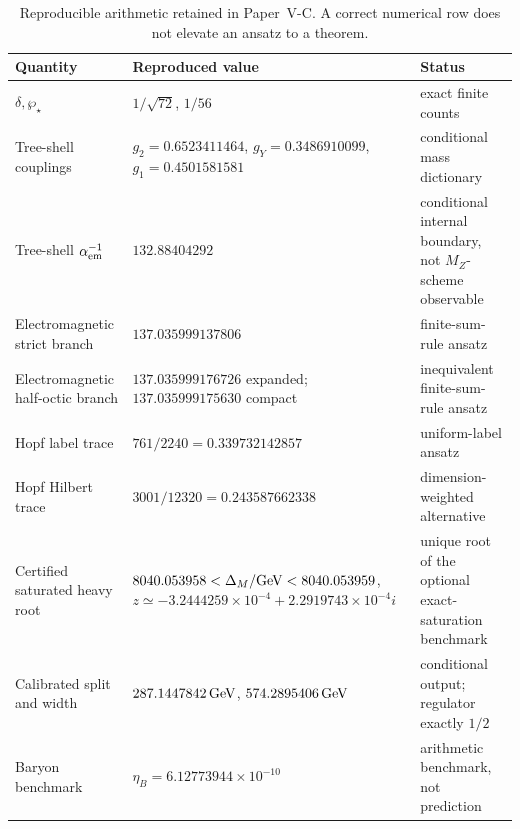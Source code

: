 \documentclass[11pt,a4paper]{article}
\begin{document}
\begin{table}[htbp]
\centering
\caption[Independent numerical audit]{Reproducible arithmetic retained in
Paper~V-C.  A correct numerical row does not elevate an ansatz to a theorem.}
\label{p7v2:tab:numerical-audit}
\small
\renewcommand{\arraystretch}{1.16}
\begin{tabularx}{\textwidth}{@{}L{0.28\textwidth}L{0.38\textwidth}Y@{}}
\toprule
Quantity & Reproduced value & Status\\
\midrule
\(\delta,\wp_\star\)
& \(1/\sqrt{72}\), \(1/56\)
& exact finite counts\\
Tree-shell couplings
& \(g_2=0.6523411464\), \(g_Y=0.3486910099\),
  \(g_1=0.4501581581\)
& conditional mass dictionary\\
Tree-shell \(\alpha_{\rm em}^{-1}\)
& \(132.88404292\)
& conditional internal boundary, not \(M_Z\)-scheme observable\\
Electromagnetic strict branch
& \(137.035999137806\)
& finite-sum-rule ansatz\\
Electromagnetic half-octic branch
& \(137.035999176726\) expanded;
  \(137.035999175630\) compact
& inequivalent finite-sum-rule ansatz\\
Hopf label trace
& \(761/2240=0.339732142857\)
& uniform-label ansatz\\
Hopf Hilbert trace
& \(3001/12320=0.243587662338\)
& dimension-weighted alternative\\
Certified saturated heavy root
& \(8040.053958<\Delta_M/{\rm GeV}<8040.053959\),
  \(z\simeq-3.2444259\times10^{-4}+2.2919743\times10^{-4}i\)
& unique root of the optional exact-saturation benchmark\\
Calibrated split and width
& \(287.1447842\,{\rm GeV}\), \(574.2895406\,{\rm GeV}\)
& conditional output; regulator exactly \(1/2\)\\
Baryon benchmark
& \(\eta_B=6.12773944\times10^{-10}\)
& arithmetic benchmark, not prediction\\
\bottomrule
\end{tabularx}
\end{table}
\end{document}
